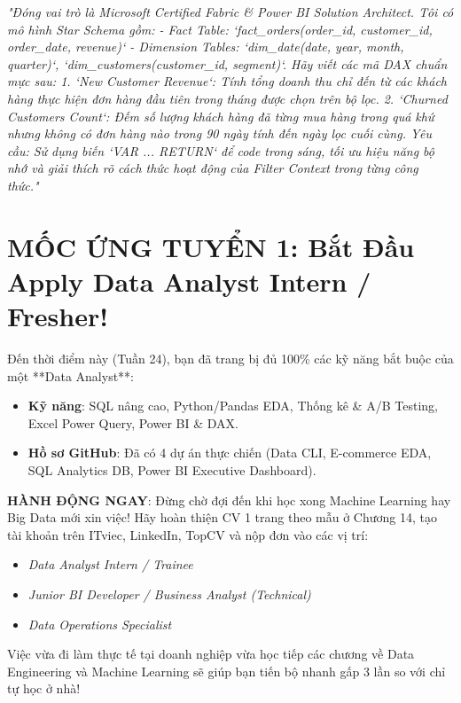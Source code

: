\begin{aipromptbox}
\textit{"Đóng vai trò là Microsoft Certified Fabric \& Power BI Solution Architect.
Tôi có mô hình Star Schema gồm:
- Fact Table: `fact\_orders(order\_id, customer\_id, order\_date, revenue)`
- Dimension Tables: `dim\_date(date, year, month, quarter)`, `dim\_customers(customer\_id, segment)`.
Hãy viết các mã DAX chuẩn mực sau:
1. `New Customer Revenue`: Tính tổng doanh thu chỉ đến từ các khách hàng thực hiện đơn hàng đầu tiên trong tháng được chọn trên bộ lọc.
2. `Churned Customers Count`: Đếm số lượng khách hàng đã từng mua hàng trong quá khứ nhưng không có đơn hàng nào trong 90 ngày tính đến ngày lọc cuối cùng.
Yêu cầu: Sử dụng biến `VAR ... RETURN` để code trong sáng, tối ưu hiệu năng bộ nhớ và giải thích rõ cách thức hoạt động của Filter Context trong từng công thức."}
\end{aipromptbox}

\section{MỐC ỨNG TUYỂN 1: Bắt Đầu Apply Data Analyst Intern / Fresher!}

\begin{cvtipbox}
Đến thời điểm này (Tuần 24), bạn đã trang bị đủ 100\% các kỹ năng bắt buộc của một **Data Analyst**:
\begin{itemize}
    \item \textbf{Kỹ năng}: SQL nâng cao, Python/Pandas EDA, Thống kê \& A/B Testing, Excel Power Query, Power BI \& DAX.
    \item \textbf{Hồ sơ GitHub}: Đã có 4 dự án thực chiến (Data CLI, E-commerce EDA, SQL Analytics DB, Power BI Executive Dashboard).
\end{itemize}
\textbf{HÀNH ĐỘNG NGAY}: Đừng chờ đợi đến khi học xong Machine Learning hay Big Data mới xin việc! 
Hãy hoàn thiện CV 1 trang theo mẫu ở Chương 14, tạo tài khoản trên ITviec, LinkedIn, TopCV và nộp đơn vào các vị trí:
\begin{itemize}
    \item \textit{Data Analyst Intern / Trainee}
    \item \textit{Junior BI Developer / Business Analyst (Technical)}
    \item \textit{Data Operations Specialist}
\end{itemize}
Việc vừa đi làm thực tế tại doanh nghiệp vừa học tiếp các chương về Data Engineering và Machine Learning sẽ giúp bạn tiến bộ nhanh gấp 3 lần so với chỉ tự học ở nhà!
\end{cvtipbox}


